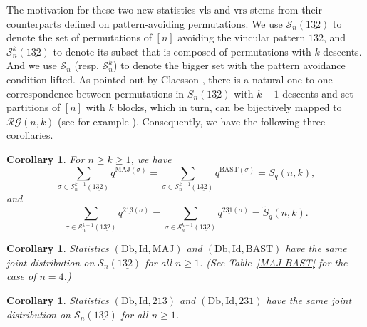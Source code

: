 \documentclass[12pt]{amsart}
\numberwithin{equation}{section}
\theoremstyle{plain}
\newtheorem{corollary}[theorem]{Corollary}
\theoremstyle{definition}
\def\MAJ{\mathrm{MAJ}}
\def\BAST{\mathrm{BAST}}
\def\los{\mathrm{los}}
\def\wlos{\mathrm{wlos}}
\def\wlcb{\mathrm{wlcb}}
\def\lcb{\mathrm{lcb}}
\def\wrs{\mathrm{vrs}}
\def\wls{\mathrm{vls}}
\def\Db{\mathrm{Db}}
\def\Id{\mathrm{Id}}
\def\SS{\mathcal{S}}
\def\P{\mathcal{P}}
\def\RG{\mathcal{RG}}
\begin{document}
The motivation for these two new statistics $\wls$ and $\wrs$ stems from their counterparts defined on pattern-avoiding permutations. We use $\SS_n(1\underline{32})$ to denote the set of permutations of $[n]$ avoiding the vincular pattern $1\underline{32}$, and $\SS_n^k(1\underline{32})$ to denote its subset that is composed of permutations with $k$ descents. And we use $\SS_n$ (resp. $\SS_n^k$) to denote the bigger set with the pattern avoidance condition lifted. As pointed out by Claesson \cite[Proposition~3]{Cl}, there is a natural one-to-one correspondence between permutations in $S_n(1\underline{32})$ with $k-1$ descents and set partitions of $[n]$ with $k$ blocks, which in turn, can be bijectively mapped to $\RG(n,k)$ (see for example \cite[Theorem~5.1]{SW}). Consequently, we have the following three corollaries.
\begin{corollary}\label{main-Sn}
For $n \geq k \geq 1$, we have
\begin{equation*}
  \sum\limits_{\sigma \in \SS_n^{k-1}(1\underline{32})}
    q^{\MAJ(\sigma)}
=
\sum\limits_{\sigma \in \SS_n^{k-1}(1\underline{32})}
    q^{\BAST(\sigma)}=S_q(n,k),
\end{equation*}
and
\begin{equation*}
   \sum\limits_{\sigma \in \SS_n^{k-1}(1\underline{32})}
q^{2\underline{13}(\sigma)}
=
\sum\limits_{\sigma \in \SS_n^{k-1}(1\underline{32})}
q^{2\underline{31}(\sigma)}=\widetilde{S}_q(n,k).
\end{equation*}
\end{corollary}

\begin{corollary}\label{main-bijectionper}
Statistics $(\Db, \Id, \MAJ)$ and
$(\Db, \Id, \BAST)$ have the same joint distribution on $\SS_n(1\underline{32})$ for all $n \geq 1$. (See Table~\ref{MAJ-BAST} for the case of $n=4$.)
\end{corollary}

\begin{corollary}\label{main-bijectionper-r}
Statistics $(\Db, \Id, 2\underline{13})$ and
$(\Db, \Id, 2\underline{31})$ have the same joint distribution on $\SS_n(1\underline{32})$ for all $n\geq 1$.
\end{corollary}

\end{document}
